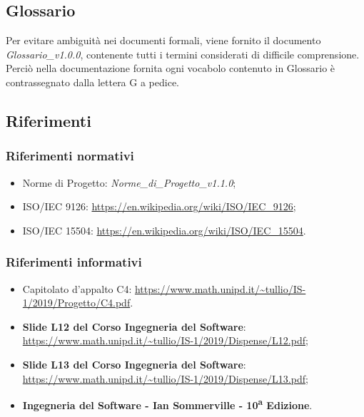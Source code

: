 \subsection{Glossario}
Per evitare ambiguità nei documenti formali, viene fornito il documento \textit{Glossario\_v1.0.0},
contenente tutti i termini considerati di difficile comprensione. Perciò nella documentazione fornita ogni vocabolo contenuto in Glossario è contrassegnato dalla lettera G a pedice.

\subsection{Riferimenti}
\subsubsection{Riferimenti normativi}
\begin{itemize}
	\item Norme di Progetto: \textit{Norme\_di\_Progetto\_v1.1.0};
	\item ISO/IEC 9126: \url{https://en.wikipedia.org/wiki/ISO/IEC_9126};
	\item ISO/IEC 15504: \url{https://en.wikipedia.org/wiki/ISO/IEC_15504}.
\end{itemize}
\subsubsection{Riferimenti informativi}
\begin{itemize}
	\item Capitolato d'appalto C4: \url{https://www.math.unipd.it/~tullio/IS-1/2019/Progetto/C4.pdf}.
	\item \textbf{Slide L12 del Corso Ingegneria del Software}:\\
	\url{https://www.math.unipd.it/~tullio/IS-1/2019/Dispense/L12.pdf};
	\item \textbf{Slide L13 del Corso Ingegneria del Software}:\\
	\url{https://www.math.unipd.it/~tullio/IS-1/2019/Dispense/L13.pdf};
	\item \textbf{Ingegneria del Software - Ian Sommerville - 10\textsuperscript{a} Edizione}.
\end{itemize}